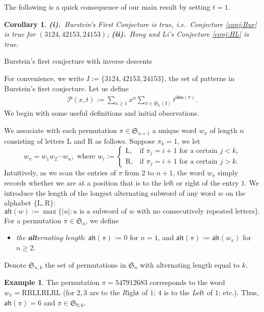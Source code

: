 \documentclass[reqno]{amsart}
\makeatletter
\numberwithin{equation}{section}
\theoremstyle{plain}
\newtheorem{corollary}[theorem]{Corollary}
\theoremstyle{definition}
\newtheorem{example}{Example}[section]
\theoremstyle{named}
\def\section{\@startsection{section}{1}%
  \z@{.7\linespacing\@plus\linespacing}{.5\linespacing}%
  {\normalfont\scshape}}%
\newcommand{\fS}{\mathfrak{S}}
\newcommand{\ides}{\mathsf{ides}}
\newcommand{\alt}{\mathsf{alt}}
\newcommand{\cP}{\mathcal{P}}
\makeatother
\begin{document}
The following is a quick consequence of our main result by setting $t=1$.

\begin{corollary}
	\textbf{\emph{(i).}}~Burstein's First Conjecture is true, i.e.~Conjecture \ref{conj:Bur} is true for $(3124, 42153, 24153)$; \textbf{\emph{(ii).}}~Hong and Li's Conjecture \ref{conj:HL} is true.
\end{corollary}

\section{Burstein's first conjecture with inverse descents}

For convenience, we write $I:=\{3124,42153,24153\}$, the set of patterns in Burstein's first conjecture. Let us define
\begin{align}
	\cP(x,t):=\sum_{n\ge 1}x^n\sum_{\pi\in \fS_{n}(I)}t^{\ides(\pi)}.
\end{align}
We begin with some useful definitions and initial observations.

We associate with each permutation $\pi\in\fS_{n+1}$ a unique word $w_{\pi}$ of length $n$ consisting of letters $\mathrm{L}$ and $\mathrm{R}$ as follows. Suppose $\pi_k=1$, we let
$$
w_{\pi}=w_1w_2\cdots w_n, \text{ where }w_i:=\begin{cases}
	\mathrm{L}, & \text{if $\pi_j=i+1$ for a certain $j<k$,}\\
	\mathrm{R}, & \text{if $\pi_j=i+1$ for a certain $j>k$.}
\end{cases}
$$
Intuitively, as we scan the entries of $\pi$ from $2$ to $n+1$, the word $w_{\pi}$ simply records whether we are at a position that is to the left or right of the entry $1$. We introduce  the length of the longest alternating subword of any word $w$ on the alphabet $\{\mathrm{L},\mathrm{R}\}$:
$$\alt(w):=\max\{|u|:\text{$u$ is a subword of $w$ with no consecutively repeated letters}\}.$$
For a permutation $\pi\in\fS_n$, we define
\begin{itemize}[leftmargin=*,align=left]
	\renewcommand{\labelitemi}{$\triangleright$}
	\item \textit{the \textbf{alt}ernating length}: $\alt(\pi):=0$ for $n=1$, and $\alt(\pi):=\alt(w_{\pi})$ for $n\ge 2$.
\end{itemize}

Denote $\fS_{n,k}$ the set of permutations in $\fS_n$ with alternating length equal to $k$. 

\begin{example}
	The permutation $\pi=547912683$ corresponds to the word $w_{\pi}=\mathrm{R}\mathrm{R}\mathrm{L}\mathrm{L}\mathrm{R}\mathrm{L}\mathrm{R}\mathrm{L}$ (for $2,3$ are to the \textsl{R}ight of $1$; $4$ is to the \textsl{L}eft of $1$; etc.). Thus, $\alt(\pi)=6$ and $\pi\in\fS_{9,6}$.
\end{example}
\end{document}
